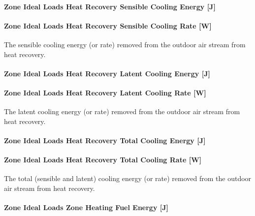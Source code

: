 \paragraph{Zone Ideal Loads Heat Recovery Sensible Cooling Energy {[}J{]}}\label{zone-ideal-loads-heat-recovery-sensible-cooling-energy-j}

\paragraph{Zone Ideal Loads Heat Recovery Sensible Cooling Rate {[}W{]}}\label{zone-ideal-loads-heat-recovery-sensible-cooling-rate-w}

The sensible cooling energy (or rate) removed from the outdoor air stream from heat recovery.

\paragraph{Zone Ideal Loads Heat Recovery Latent Cooling Energy {[}J{]}}\label{zone-ideal-loads-heat-recovery-latent-cooling-energy-j}

\paragraph{Zone Ideal Loads Heat Recovery Latent Cooling Rate {[}W{]}}\label{zone-ideal-loads-heat-recovery-latent-cooling-rate-w}

The latent cooling energy (or rate) removed from the outdoor air stream from heat recovery.

\paragraph{Zone Ideal Loads Heat Recovery Total Cooling Energy {[}J{]}}\label{zone-ideal-loads-heat-recovery-total-cooling-energy-j}

\paragraph{Zone Ideal Loads Heat Recovery Total Cooling Rate {[}W{]}}\label{zone-ideal-loads-heat-recovery-total-cooling-rate-w}

The total (sensible and latent) cooling energy (or rate) removed from the outdoor air stream from heat recovery.

\paragraph{Zone Ideal Loads Zone Heating Fuel Energy {[}J{]}}\label{zone-ideal-loads-zone-heating-fuel-energy-j}

